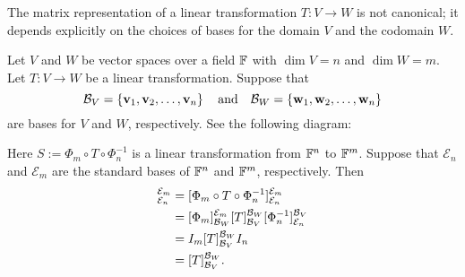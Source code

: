 \documentclass[11pt,openany]{article}
\renewcommand{\vec}[1]{\mathbf{#1}}
\begin{document}
\vspace{20pt}
\begin{remark*}
The matrix representation of a linear transformation $T:V\to W$ is not canonical; it depends explicitly on the choices of bases for the domain $V$ and the codomain $W$.
\end{remark*}
\newpage
\begin{observation}
Let $V$ and $W$ be vector spaces over a field $\mathbb{F}$ with $\dim V=n$ and $\dim W=m$. Let $T:V\to W$ be a linear transformation. Suppose that \[
\basis_V=\set{\vec{v}_1,\vec{v}_2,\dots,\vec{v}_n}\quad\text{and}\quad\basis_W=\set{\vec{w}_1,\vec{w}_2,\dots,\vec{w}_n}
\] are bases for $V$ and $W$, respectively. See the following diagram:
\begin{center}
\end{center} Here $S:=\Phi_m\circ T\circ \Phi_n^{-1}$ is a linear transformation from $\mathbb{F}^n$ to $\mathbb{F}^m$. Suppose that $\mathcal{E}_n$ and $\mathcal{E}_m$ are the standard bases of $\mathbb{F}^n$ and $\mathbb{F}^m$, respectively. Then \begin{align*}
	[S]_{\mathcal{E}_n}^{\mathcal{E}_m} &= [\Phi_m\circ T\circ \Phi_n^{-1}]_{\mathcal{E}_n}^{\mathcal{E}_m}\\
	&=[\Phi_m]_{\basis_W}^{\mathcal{E}_m}[T]_{\basis_V}^{\basis_W}[\Phi_n^{-1}]_{\mathcal{E}_n}^{\basis_V}\\
	&=I_m[T]_{\basis_V}^{\basis_W}I_n\\
	&=[T]_{\basis_V}^{\basis_W}.
\end{align*}
\end{observation}\vspace{10pt}
\end{document}
